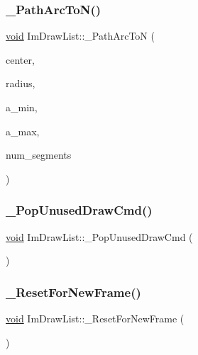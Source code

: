 \mbox{\label{structImDrawList_a855fcd28cd12b81975e8a61ea2e80e96}} 
\subsubsection{\texorpdfstring{\+\_\+\+Path\+Arc\+To\+N()}{\_PathArcToN()}}
{\footnotesize\ttfamily \hyperlink{imgui__impl__opengl3__loader_8h_ac668e7cffd9e2e9cfee428b9b2f34fa7}{void} Im\+Draw\+List\+::\+\_\+\+Path\+Arc\+ToN (\begin{DoxyParamCaption}\item[{const \hyperlink{structImVec2}{Im\+Vec2} \&}]{center,  }\item[{float}]{radius,  }\item[{float}]{a\+\_\+min,  }\item[{float}]{a\+\_\+max,  }\item[{int}]{num\+\_\+segments }\end{DoxyParamCaption})}

\mbox{\label{structImDrawList_a2cb0295fcd3062bfedbebbad55865455}} 
\subsubsection{\texorpdfstring{\+\_\+\+Pop\+Unused\+Draw\+Cmd()}{\_PopUnusedDrawCmd()}}
{\footnotesize\ttfamily \hyperlink{imgui__impl__opengl3__loader_8h_ac668e7cffd9e2e9cfee428b9b2f34fa7}{void} Im\+Draw\+List\+::\+\_\+\+Pop\+Unused\+Draw\+Cmd (\begin{DoxyParamCaption}{ }\end{DoxyParamCaption})}

\mbox{\label{structImDrawList_a5f78fe195b2507e5926560f591141ff3}} 
\subsubsection{\texorpdfstring{\+\_\+\+Reset\+For\+New\+Frame()}{\_ResetForNewFrame()}}
{\footnotesize\ttfamily \hyperlink{imgui__impl__opengl3__loader_8h_ac668e7cffd9e2e9cfee428b9b2f34fa7}{void} Im\+Draw\+List\+::\+\_\+\+Reset\+For\+New\+Frame (\begin{DoxyParamCaption}{ }\end{DoxyParamCaption})}

